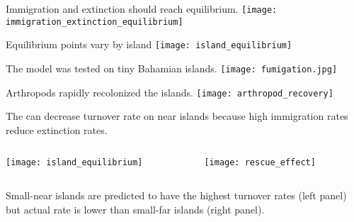 \documentclass[t,handout]{beamer}  %
\begin{document}
\begin{frame}{Immigration and extinction should reach equilibrium.}
	\centering
		\texttt{[image: immigration\_extinction\_equilibrium]}
\end{frame}

\begin{frame}{Equilibrium points vary by island }
	\centering
		\texttt{[image: island\_equilibrium]}
\end{frame}

\begin{frame}{The model was tested  on tiny Bahamian islands.}
	\centering
		\texttt{[image: fumigation.jpg]}
\end{frame}

\begin{frame}{Arthropods rapidly recolonized the islands.}
	\centering
		\texttt{[image: arthropod\_recovery]}
\end{frame}

\begin{frame}{The  can decrease turnover rate on near islands because high immigration rates reduce extinction rates.}
	\centering
	\begin{columns}[T]
		\begin{column}{0.4\textwidth}
			\texttt{[image: island\_equilibrium]}
		\end{column}
		\begin{column}{0.6\textwidth}
			\texttt{[image: rescue\_effect]}
		\end{column}
	\end{columns}

	\raggedright
	\hangpara Small-near islands are predicted to have the highest turnover rates (left panel) but actual rate is lower than small-far islands (right panel).

\end{frame}
\end{document}
